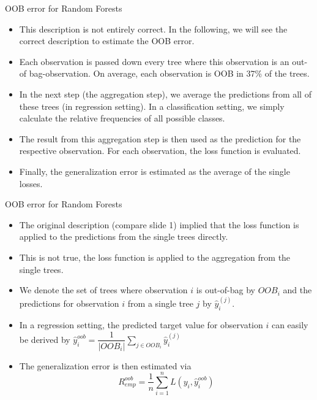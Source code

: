 \documentclass[11pt,compress,t,notes=noshow, xcolor=table]{beamer}
\begin{document}
\begin{vbframe}{OOB error for Random Forests}
\begin{itemize}
\item This description is not entirely correct. In the following, we will see the correct description to estimate the OOB error. 
\item Each observation is passed down every  tree where this observation is an out-of bag-observation. On average, each observation is OOB in 37\% of the trees. 
\item In the next step (the aggregation step), we average the predictions from all of these trees (in regression setting). In a classification setting, we simply calculate the relative frequencies of all possible classes. 
\item The result from this aggregation step is then used as the prediction for the respective observation. For each observation, the loss function is evaluated. 
\item Finally, the generalization error is estimated as the average of the single losses.  
\end{itemize}
\end{vbframe}


\begin{vbframe}{OOB error for Random Forests}
\begin{itemize}
\item The original description (compare slide 1) implied that the loss function is applied to the predictions from the single trees directly. 
\item This is not true, the loss function is applied to the aggregation from the single trees. 
\item We denote the set of trees where observation $i$ is out-of-bag by $OOB_i$ and the predictions for observation $i$ from a single tree $j$ by $\hat y_i^{(j)}$.
\item In a regression setting, the predicted target value for observation $i$ can easily be derived by $\hat y^{oob}_{i} = \dfrac{1}{|OOB_i|}\sum\limits_{j\in OOB_i} \hat y_i^{(j)}$
\item The generalization error is then estimated via $$R_{emp}^{oob} = \dfrac 1n \sum_{i=1}^n L(y_i, \hat  y^{oob}_{i})$$
\end{itemize}
\end{vbframe}
\end{document}
